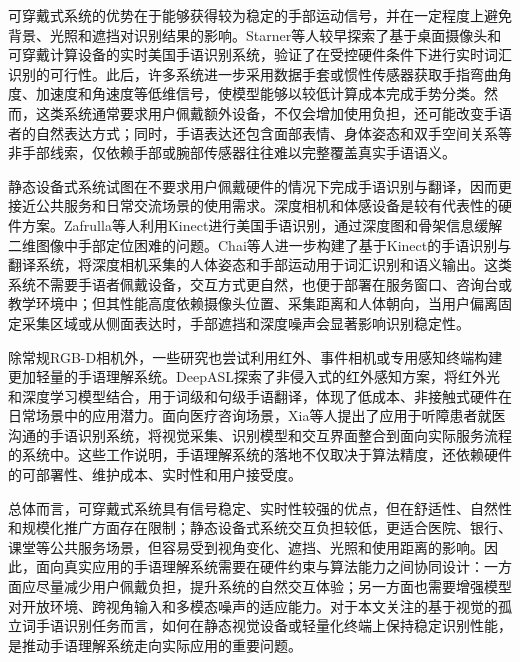 可穿戴式系统的优势在于能够获得较为稳定的手部运动信号，并在一定程度上避免背景、光照和遮挡对识别结果的影响。Starner等人较早探索了基于桌面摄像头和可穿戴计算设备的实时美国手语识别系统，验证了在受控硬件条件下进行实时词汇识别的可行性\citep{starner1998real}。此后，许多系统进一步采用数据手套或惯性传感器获取手指弯曲角度、加速度和角速度等低维信号，使模型能够以较低计算成本完成手势分类。然而，这类系统通常要求用户佩戴额外设备，不仅会增加使用负担，还可能改变手语者的自然表达方式；同时，手语表达还包含面部表情、身体姿态和双手空间关系等非手部线索，仅依赖手部或腕部传感器往往难以完整覆盖真实手语语义。

静态设备式系统试图在不要求用户佩戴硬件的情况下完成手语识别与翻译，因而更接近公共服务和日常交流场景的使用需求。深度相机和体感设备是较有代表性的硬件方案。Zafrulla等人利用Kinect进行美国手语识别，通过深度图和骨架信息缓解二维图像中手部定位困难的问题\citep{zafrulla2011american}。Chai等人进一步构建了基于Kinect的手语识别与翻译系统，将深度相机采集的人体姿态和手部运动用于词汇识别和语义输出\citep{chai2013sign}。这类系统不需要手语者佩戴设备，交互方式更自然，也便于部署在服务窗口、咨询台或教学环境中；但其性能高度依赖摄像头位置、采集距离和人体朝向，当用户偏离固定采集区域或从侧面表达时，手部遮挡和深度噪声会显著影响识别稳定性。

除常规RGB-D相机外，一些研究也尝试利用红外、事件相机或专用感知终端构建更加轻量的手语理解系统。DeepASL探索了非侵入式的红外感知方案，将红外光和深度学习模型结合，用于词级和句级手语翻译，体现了低成本、非接触式硬件在日常场景中的应用潜力\citep{fang2018deepasl}。面向医疗咨询场景，Xia等人提出了应用于听障患者就医沟通的手语识别系统，将视觉采集、识别模型和交互界面整合到面向实际服务流程的系统中\citep{xia2022sign}。这些工作说明，手语理解系统的落地不仅取决于算法精度，还依赖硬件的可部署性、维护成本、实时性和用户接受度。

总体而言，可穿戴式系统具有信号稳定、实时性较强的优点，但在舒适性、自然性和规模化推广方面存在限制；静态设备式系统交互负担较低，更适合医院、银行、课堂等公共服务场景，但容易受到视角变化、遮挡、光照和使用距离的影响。因此，面向真实应用的手语理解系统需要在硬件约束与算法能力之间协同设计：一方面应尽量减少用户佩戴负担，提升系统的自然交互体验；另一方面也需要增强模型对开放环境、跨视角输入和多模态噪声的适应能力。对于本文关注的基于视觉的孤立词手语识别任务而言，如何在静态视觉设备或轻量化终端上保持稳定识别性能，是推动手语理解系统走向实际应用的重要问题。
